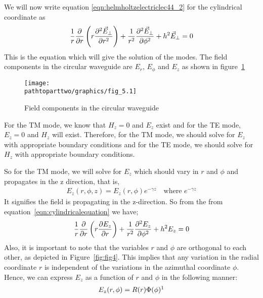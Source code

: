 We will now write equation \ref{eqn:helmholtzelectriclec44_2} for the cylindrical coordinate as 
\begin{align}
\frac{1}{r}\partialderivative{}{r}\left(r\partialderivative[2]{\vec{E}_\bot}{r}\right) + \frac{1}{r^2}\partialderivative[2]{\vec{E}_\bot}{\phi}+ h^2\vec{E}_\bot = 0 
\label{eqn:cylindricalequation}   
\end{align}
This is the equation which will give the solution of the modes. The field components in the circular waveguide are $E_r$, $E_\phi$ and $E_z$ as shown in figure~\ref{fig:fig5}
\begin{figure}[h]
\centering
\texttt{[image: \\pathtoparttwo/graphics/fig\_5.1]}
\caption{Field components in the circular waveguide}
\label{fig:fig5}
\end{figure}

For the TM mode, we know that $H_z=0$ and $E_z$ exist and for the TE mode, $E_z=0$ and $H_z$ will exist. Therefore, for the TM mode, we should solve for $E_z$ with appropriate boundary conditions and for the TE mode, we should solve for $H_z$ with appropriate boundary conditions. 

So for the TM mode, we will solve for $E_z$ which should vary in $r$ and $\phi$ and propagates in the z direction, that is,
\begin{align*}
E_z(r,\phi, z)=E_z(r,\phi)e^{-\gamma z}\quad\text{where }e^{-\gamma z}
\end{align*}
It signifies the field is propagating in the z-direction. So from the from equation~\eqref{eqn:cylindricalequation} we have;
\begin{equation}
\frac{1}{r}\partialderivative{}{r}\left(r\partialderivative{E_z}{r}\right) + \frac{1}{r^2}\partialderivative[2]{E_z}{\phi} + h^2 E_z = 0 
\label{eqn:pdecircularwaveguide}
\end{equation}
Also, it is important to note that the variables $r$ and $\phi$ are orthogonal to each other, as depicted in Figure~\ref{fig:fig4}. This implies that any variation in the radial coordinate $r$ is independent of the variations in the azimuthal coordinate $\phi$. Hence, we can express $E_z$ as a function of $r$ and $\phi$ in the following manner:
\begin{align*}
E_z(r, \phi) = R(r)\Phi(\phi)\footnotemark
\end{align*}

